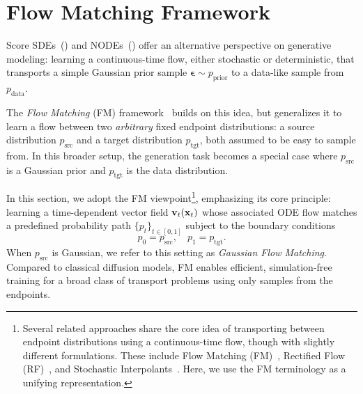 




\newpage
\clearpage
\section{\texorpdfstring{Flow Matching Framework}{Flow Matching Framework}}\label{sec:flow-matching-framework}

Score SDEs~() and NODEs~() offer an alternative perspective on generative modeling: learning a continuous-time flow, either stochastic or deterministic, that transports a simple Gaussian prior sample $\bm{\epsilon} \sim p_{\text{prior}}$ to a data-like sample from $p_{\text{data}}$.

The \emph{Flow Matching} (FM) framework~\citep{lipman2022flow,lipman2024flow,tongimproving} builds on this idea, but generalizes it to learn a flow between two \emph{arbitrary} fixed endpoint distributions: a source distribution $p_{\text{src}}$ and a target distribution $p_{\text{tgt}}$, both assumed to be easy to sample from. In this broader setup, the generation task becomes a special case where $p_{\text{src}}$ is a Gaussian prior and $p_{\text{tgt}}$ is the data distribution.

In this section, we adopt the FM viewpoint\footnote{Several related approaches share the core idea of transporting between endpoint distributions using a continuous-time flow, though with slightly different formulations. These include Flow Matching (FM)~\citep{lipman2022flow,neklyudov2023action}, Rectified Flow (RF)~\citep{liu2022rectified,heitz2023iterative}, and Stochastic Interpolants~\citep{albergo2023stochastic,albergobuilding,ma2024sit}. Here, we use the FM terminology as a unifying representation.}, emphasizing its core principle: learning a time-dependent vector field $\mathbf{v}_t({\mathbf{x}}_t)$ whose associated ODE flow matches a predefined probability path $\{p_t\}_{t \in [0,1]}$ subject to the boundary conditions
\[
p_0 = p_{\text{src}}, \quad p_1 = p_{\text{tgt}}.
\]
When $p_{\text{src}}$ is Gaussian, we refer to this setting as \emph{Gaussian Flow Matching}. Compared to classical diffusion models, FM enables efficient, simulation-free training for a broad class of transport problems using only samples from the endpoints.






